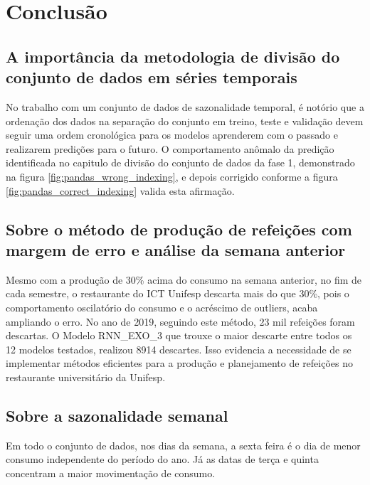 \documentclass[	12pt, Times, openright, twoside, a4paper, english, brazil]{abntex2}
\begin{document}
  \chapter{Conclusão}
    \section{A importância da metodologia de divisão do conjunto de dados em séries temporais}
       No trabalho com um conjunto de dados de sazonalidade temporal, é notório que a ordenação dos dados na separação do conjunto em treino, teste e validação devem seguir uma ordem cronológica para os modelos aprenderem com o passado e realizarem predições para o futuro. 
        O comportamento anômalo da predição identificada no capitulo de divisão do conjunto de dados da fase 1, demonstrado na figura \ref{fig:pandas_wrong_indexing}, e depois corrigido conforme a figura \ref{fig:pandas_correct_indexing} valida esta afirmação.

    \section{Sobre o método de produção de refeições com margem de erro e análise da semana anterior}
        Mesmo com a produção de 30\% acima do consumo na semana anterior, no fim de cada semestre, o restaurante do ICT Unifesp descarta mais do que 30\%, pois o comportamento oscilatório do consumo e o acréscimo de outliers, acaba ampliando o erro. No ano de 2019, seguindo este método, 23 mil refeições foram descartas.
        O Modelo RNN\_EXO\_3 que trouxe o maior descarte entre todos os 12 modelos testados, realizou 8914 descartes.
        Isso evidencia a necessidade de se implementar métodos eficientes para a produção e planejamento de refeições no restaurante universitário da Unifesp.
    
    \section{Sobre a sazonalidade semanal}
        Em todo o conjunto de dados, nos dias da semana, a sexta feira é o dia de menor consumo independente do período do ano. Já as datas de terça e quinta concentram a maior movimentação de consumo.
    
\end{document}
